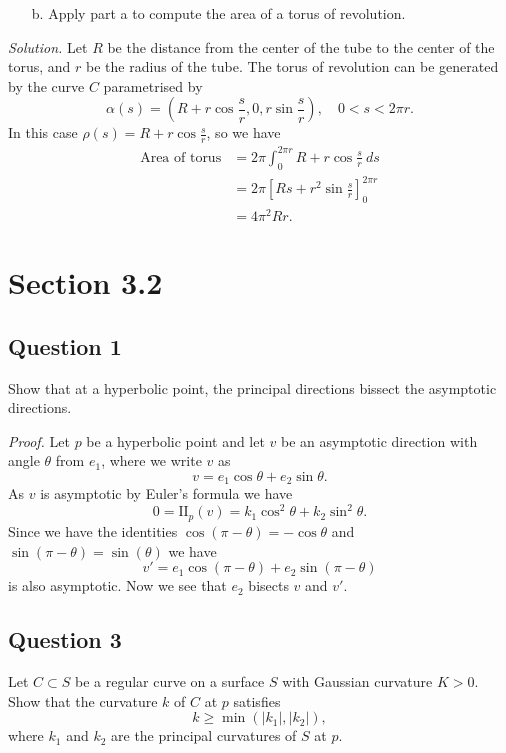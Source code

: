 \documentclass[12pt]{article}
\begin{document}
\begin{enumerate}
    \item[b.] Apply part a to compute the area of a torus of revolution.
\end{enumerate}

\emph{Solution.}
Let \(R\) be the distance from the center of the tube to the center of the torus, and \(r\) be the radius of the tube.
The torus of revolution can be generated by the curve \(C\) parametrised by
\[ \alpha(s) = \left(R + r \cos\frac{s}{r},0,r\sin\frac{s}{r}\right), \quad 0 < s < 2\pi r.\]
In this case \(\rho(s) = R + r\cos\frac{s}{r}\),
so we have
\begin{align*}
    \text{Area of torus}
    &= 2\pi \int_0^{2\pi r} R + r\cos \frac{s}{r}\ ds \\
    &= 2\pi \left[ Rs + r^2\sin\frac{s}{r} \right]_0^{2\pi r} \\
    &= 4\pi^2 Rr.
\end{align*}


\section{Section 3.2}
\subsection*{Question 1}

Show that at a hyperbolic point, the principal directions bissect the asymptotic directions.

\emph{Proof.}
Let \(p\) be a hyperbolic point and let \(v\) be an asymptotic direction with angle \(\theta\) from \(e_1\),
where we write \(v\) as
\[ v = e_1\cos\theta + e_2\sin\theta. \]
As \(v\) is asymptotic by Euler's formula we have
\[ 0 = \mathrm{II}_p(v) = k_1 \cos^2\theta + k_2 \sin^2\theta. \]
Since we have the identities \(\cos(\pi-\theta) = -\cos\theta\) and \(\sin(\pi-\theta) = \sin(\theta)\)
we have
\[ v' = e_1\cos(\pi-\theta) + e_2\sin(\pi-\theta) \]
is also asymptotic.
Now we see that \(e_2\) bisects \(v\) and \(v'\).

\subsection*{Question 3}

Let \(C\subset S\) be a regular curve on a surface \(S\) with Gaussian curvature \(K>0\).
Show that the curvature \(k\) of \(C\) at \(p\) satisfies \[ k\geq \min(|k_1|,|k_2|),\]
where \(k_1\) and \(k_2\) are the principal curvatures of \(S\) at \(p\).
\end{document}
